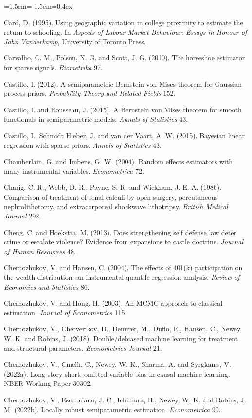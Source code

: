 \begin{list}{}{\leftmargin=1.5em\itemindent=-1.5em\itemsep=0.4ex}
\item Card, D. (1995). Using geographic variation in college proximity to estimate the return to schooling. In \emph{Aspects of Labour Market Behaviour: Essays in Honour of John Vanderkamp}, University of Toronto Press.
\item Carvalho, C. M., Polson, N. G. and Scott, J. G. (2010). The horseshoe estimator for sparse signals. \emph{Biometrika} 97.
\item Castillo, I. (2012). A semiparametric Bernstein von Mises theorem for Gaussian process priors. \emph{Probability Theory and Related Fields} 152.
\item Castillo, I. and Rousseau, J. (2015). A Bernstein von Mises theorem for smooth functionals in semiparametric models. \emph{Annals of Statistics} 43.
\item Castillo, I., Schmidt Hieber, J. and van der Vaart, A. W. (2015). Bayesian linear regression with sparse priors. \emph{Annals of Statistics} 43.
\item Chamberlain, G. and Imbens, G. W. (2004). Random effects estimators with many instrumental variables. \emph{Econometrica} 72.
\item Charig, C. R., Webb, D. R., Payne, S. R. and Wickham, J. E. A. (1986). Comparison of treatment of renal calculi by open surgery, percutaneous nephrolithotomy, and extracorporeal shockwave lithotripsy. \emph{British Medical Journal} 292.
\item Cheng, C. and Hoekstra, M. (2013). Does strengthening self defense law deter crime or escalate violence? Evidence from expansions to castle doctrine. \emph{Journal of Human Resources} 48.
\item Chernozhukov, V. and Hansen, C. (2004). The effects of 401(k) participation on the wealth distribution: an instrumental quantile regression analysis. \emph{Review of Economics and Statistics} 86.
\item Chernozhukov, V. and Hong, H. (2003). An MCMC approach to classical estimation. \emph{Journal of Econometrics} 115.
\item Chernozhukov, V., Chetverikov, D., Demirer, M., Duflo, E., Hansen, C., Newey, W. K. and Robins, J. (2018). Double/debiased machine learning for treatment and structural parameters. \emph{Econometrics Journal} 21.
\item Chernozhukov, V., Cinelli, C., Newey, W. K., Sharma, A. and Syrgkanis, V. (2022a). Long story short: omitted variable bias in causal machine learning. NBER Working Paper 30302.
\item Chernozhukov, V., Escanciano, J. C., Ichimura, H., Newey, W. K. and Robins, J. M. (2022b). Locally robust semiparametric estimation. \emph{Econometrica} 90.

\end{list}
